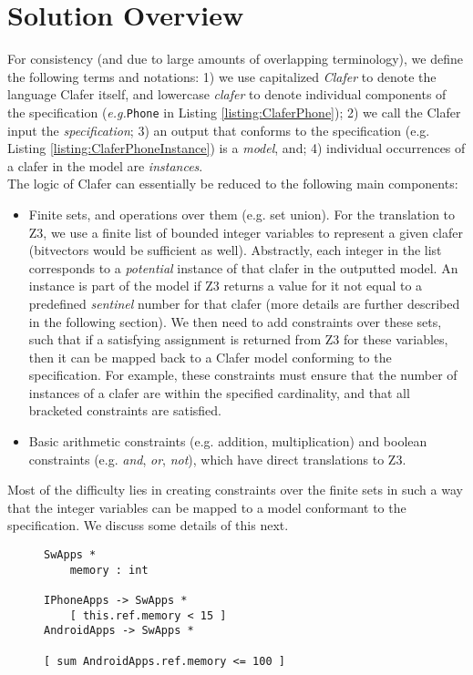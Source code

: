 \documentclass{article}
\newcommand{\eg}{\emph{e.g.}\xspace}
\begin{document}
\section{Solution Overview}
For consistency (and due to large amounts of overlapping terminology), we define the following terms and notations: 1) we use capitalized \textit{Clafer} to denote the language Clafer itself, and lowercase \textit{clafer} to denote individual components of the specification (\eg \texttt{Phone} in Listing \ref{listing:ClaferPhone}); 2) we call the Clafer input the \textit{specification}; 3) an output that conforms to the specification (e.g. Listing \ref{listing:ClaferPhoneInstance}) is a \textit{model}, and; 4) individual occurrences of a clafer in the model are \textit{instances}. \\
\indent The logic of Clafer can essentially be reduced to the following main components:
\begin{itemize}
\item Finite sets, and operations over them (e.g. set union). For the translation to Z3, we use a finite list of bounded integer variables to represent a given clafer (bitvectors would be sufficient as well). Abstractly, each integer in the list corresponds to a \textit{potential} instance of that clafer in the outputted model. An instance is part of the model if Z3 returns a value for it not equal to a predefined \textit{sentinel} number for that clafer (more details are further described in the following section). We then need to add constraints over these sets, such that if a satisfying assignment is returned from Z3 for these variables, then it can be mapped back to a Clafer model conforming to the specification. For example, these constraints must ensure that the number of instances of a clafer are within the specified cardinality, and that all bracketed constraints are satisfied.
\item Basic arithmetic constraints (e.g. addition, multiplication) and boolean constraints (e.g. \textit{and}, \textit{or}, \textit{not}), which have direct translations to Z3.
\end{itemize} 

Most of the difficulty lies in creating constraints over the finite sets in such a way that the integer variables can be mapped to a model conformant to the specification. We discuss some details of this next.


\begin{figure}[!t]
\begin{center}
\begin{lstlisting}[language=clafer, caption=A more complex mobile phone specification in clafer., label={listing:ClaferMoreComplexSpec},  xleftmargin=.2\textwidth, xrightmargin=.2\textwidth]
SwApps *
	memory : int

IPhoneApps -> SwApps *	
	[ this.ref.memory < 15 ]
AndroidApps -> SwApps *

[ sum AndroidApps.ref.memory <= 100 ]	
\end{lstlisting}
\end{center}
\end{figure}
\end{document}
